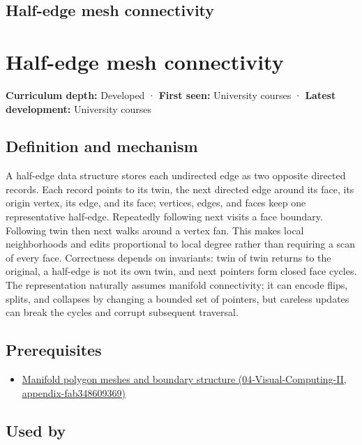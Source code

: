 \hypertarget{appendix-1aea26b2307f}{}
\section*{Half-edge mesh connectivity}
\chapter{Half-edge mesh connectivity}\label{appendix-1aea26b2307f-half-edge-mesh-connectivity}

\textbf{Curriculum depth:} Developed · \textbf{First seen:} University courses · \textbf{Latest development:} University courses

\section{Definition and mechanism}\label{appendix-1aea26b2307f-definition-and-mechanism}

A half-edge data structure stores each undirected edge as two opposite directed records. Each record points to its twin, the next directed edge around its face, its origin vertex, its edge, and its face; vertices, edges, and faces keep one representative half-edge. Repeatedly following next visits a face boundary. Following twin then next walks around a vertex fan. This makes local neighborhoods and edits proportional to local degree rather than requiring a scan of every face. Correctness depends on invariants: twin of twin returns to the original, a half-edge is not its own twin, and next pointers form closed face cycles. The representation naturally assumes manifold connectivity; it can encode flips, splits, and collapses by changing a bounded set of pointers, but careless updates can break the cycles and corrupt subsequent traversal.

\section{Prerequisites}\label{appendix-1aea26b2307f-prerequisites}

\begin{itemize}
\tightlist
\item
  \href{../04-Visual-Computing-II/main.pdf\#nameddest=appendix-fab348609369}{Manifold polygon meshes and boundary structure (04-Visual-Computing-II, appendix-fab348609369)}
\end{itemize}

\section{Used by}\label{appendix-1aea26b2307f-used-by}

